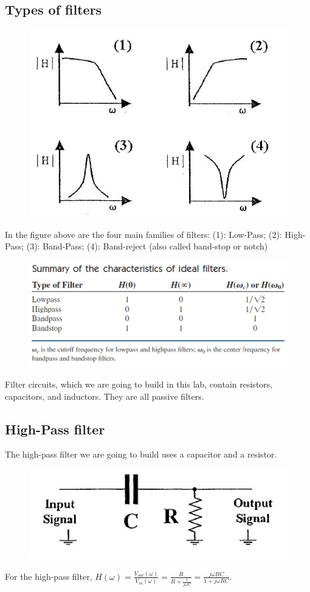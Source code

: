 \documentclass[a4paper]{report}
\begin{document}
\subsection{Types of filters}
\begin{figure}[H]
	\centering
	\includegraphics[width=0.8\linewidth]{1.jpg}
\end{figure}
In the figure above are the four main families of filters:
(1): Low-Pass; (2): High-Pass; (3): Band-Pass; (4): Band-reject (also called band-stop or notch)
\begin{figure}[H]
	\centering
	\includegraphics[width=0.8\linewidth]{2.jpg}
\end{figure}
Filter circuits, which we are going to build in this lab, contain resistors, capacitors, and inductors. They are all passive filters.
\subsection{High-Pass filter}
The high-pass filter we are going to build uses a capacitor and a resistor.
\begin{figure}[H]
	\centering
	\includegraphics[width=0.8\linewidth]{3.jpg}
\end{figure}
For the high-pass filter, $H(\omega)=\frac{V_{out}(\omega)}{V_{in}(\omega)}=\frac{R}{R+\frac{1}{j\omega C}}=\frac{j\omega RC}{1+j\omega RC}$.
\end{document}
